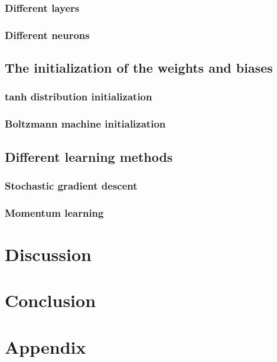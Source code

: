 \documentclass[12pt,a4paper]{article}
\begin{document}
\subsubsection{Different layers}
\subsubsection{Different neurons}

\subsection{The initialization of the weights and biases}
\subsubsection{tanh distribution initialization}
\subsubsection{Boltzmann machine initialization}

\subsection{Different learning methods}
\subsubsection{Stochastic gradient descent}
\subsubsection{Momentum learning}


\section{Discussion}


\section{Conclusion}


\newpage
\section{Appendix}
\end{document}

